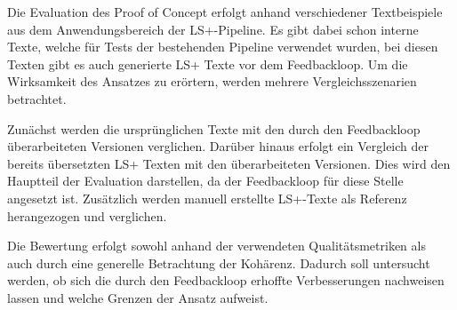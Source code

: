 
Die Evaluation des Proof of Concept erfolgt anhand verschiedener Textbeispiele aus dem Anwendungsbereich der LS+-Pipeline.
Es gibt dabei schon interne Texte, welche für Tests der bestehenden Pipeline verwendet wurden, bei diesen Texten gibt es auch generierte LS+ Texte vor dem Feedbackloop.
Um die Wirksamkeit des Ansatzes zu erörtern, werden mehrere Vergleichsszenarien betrachtet.

Zunächst werden die ursprünglichen Texte mit den durch den Feedbackloop überarbeiteten Versionen verglichen.
Darüber hinaus erfolgt ein Vergleich der bereits übersetzten LS+ Texten mit den überarbeiteten Versionen.
Dies wird den Hauptteil der Evaluation darstellen, da der Feedbackloop für diese Stelle angesetzt ist.
Zusätzlich werden manuell erstellte LS+-Texte als Referenz herangezogen und verglichen.

Die Bewertung erfolgt sowohl anhand der verwendeten Qualitätsmetriken als auch durch eine generelle Betrachtung der Kohärenz.
Dadurch soll untersucht werden, ob sich die durch den Feedbackloop erhoffte Verbesserungen nachweisen lassen und welche Grenzen der Ansatz aufweist.